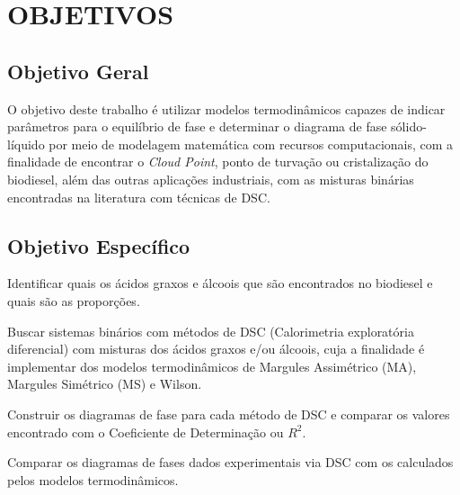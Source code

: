 
\chapter{OBJETIVOS}
\label{chap:objetivos}

\section{Objetivo Geral}

O objetivo deste trabalho é utilizar modelos termodinâmicos capazes de indicar parâmetros para o equilíbrio de fase e determinar o diagrama de fase sólido-líquido por meio de modelagem matemática com recursos computacionais, com a finalidade de encontrar o \textit{Cloud Point}, ponto de turvação ou cristalização do biodiesel, além das outras aplicações industriais, com as misturas binárias encontradas na literatura com técnicas de DSC.

\section{Objetivo Específico}

Identificar quais os ácidos graxos e álcoois que são encontrados no biodiesel e quais são as proporções.

Buscar sistemas binários com métodos de DSC (Calorimetria exploratória diferencial) com misturas dos ácidos graxos e/ou álcoois, cuja a finalidade é implementar dos modelos termodinâmicos de Margules Assimétrico (MA), Margules Simétrico (MS) e Wilson.

Construir os diagramas de fase para cada método de DSC e comparar os valores encontrado com o Coeficiente de Determinação ou $R^2$.

Comparar os diagramas de fases dados experimentais via DSC com os calculados pelos modelos termodinâmicos.